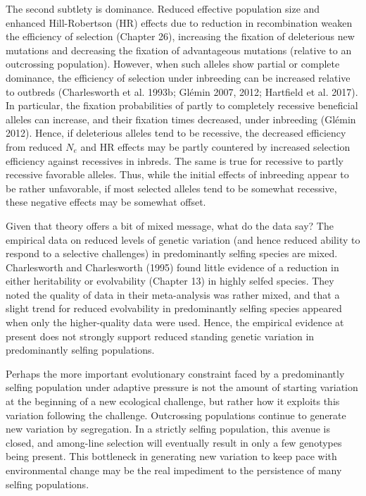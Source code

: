 \documentclass{article}
\begin{document}
The second subtlety is dominance. Reduced effective population size and enhanced Hill-Robertson (HR) effects due to reduction in recombination weaken the efficiency of selection (Chapter 26), increasing the fixation of deleterious new mutations and decreasing the fixation of advantageous mutations (relative to an outcrossing population). However, when such alleles show partial or complete dominance, the efficiency of selection under inbreeding can be increased relative to outbreds (Charlesworth et al. 1993b; Glémin 2007, 2012; Hartfield et al. 2017). In particular, the fixation probabilities of partly to completely recessive beneficial alleles can increase, and their fixation times decreased, under inbreeding (Glémin 2012). Hence, if deleterious alleles tend to be recessive, the decreased efficiency from reduced  $ N_{e} $ and HR effects may be partly countered by increased selection efficiency against recessives in inbreds. The same is true for recessive to partly recessive favorable alleles. Thus, while the initial effects of inbreeding appear to be rather unfavorable, if most selected alleles tend to be somewhat recessive, these negative effects may be somewhat offset.

Given that theory offers a bit of mixed message, what do the data say? The empirical data on reduced levels of genetic variation (and hence reduced ability to respond to a selective challenges) in predominantly selfing species are mixed. Charlesworth and Charlesworth (1995) found little evidence of a reduction in either heritability or evolvability (Chapter 13) in highly selfed species. They noted the quality of data in their meta-analysis was rather mixed, and that a slight trend for reduced evolvability in predominantly selfing species appeared when only the higher-quality data were used. Hence, the empirical evidence at present does not strongly support reduced standing genetic variation in predominantly selfing populations.

Perhaps the more important evolutionary constraint faced by a predominantly selfing population under adaptive pressure is not the amount of starting variation at the beginning of a new ecological challenge, but rather how it exploits this variation following the challenge. Outcrossing populations continue to generate new variation by segregation. In a strictly selfing population, this avenue is closed, and among-line selection will eventually result in only a few genotypes being present. This bottleneck in generating new variation to keep pace with environmental change may be the real impediment to the persistence of many selfing populations.
\end{document}
